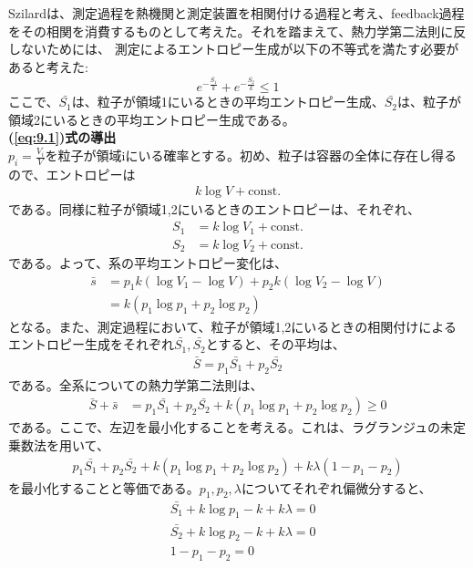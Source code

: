\documentclass[a4paper,11pt]{jsarticle}
\numberwithin{equation}{section}
\begin{document}
Szilardは、測定過程を熱機関と測定装置を相関付ける過程と考え、feedback過程をその相関を消費するものとして考えた。それを踏まえて、熱力学第二法則に反しないためには、
測定によるエントロピー生成が以下の不等式を満たす必要があると考えた:
\begin{equation}
    e^{-\frac{\bar{S_1}}{k}} + e^{-\frac{\bar{S_2}}{k}} \leq 1 \label{eq:9.1}
\end{equation}
ここで、$\bar{S_1}$は、粒子が領域1にいるときの平均エントロピー生成、$\bar{S_2}$は、粒子が領域2にいるときの平均エントロピー生成である。\\
\textbf{(\ref{eq:9.1})式の導出}\\
$p_i = \frac{V_i}{V}$を粒子が領域iにいる確率とする。初め、粒子は容器の全体に存在し得るので、エントロピーは
\begin{align}
k\log V + \text{const.}
\end{align}
である。同様に粒子が領域1,2にいるときのエントロピーは、それぞれ、
\begin{align}
    S_1 &= k\log V_1 + \text{const.} \\
    S_2 &= k\log V_2 + \text{const.}
\end{align}
である。よって、系の平均エントロピー変化は、
\begin{align}
    \bar{s} &=p_1k(\log V_1 - \log V) + p_2k(\log V_2 - \log V) \\
    &= k(p_1\log p_1 + p_2\log p_2)
\end{align}
となる。また、測定過程において、粒子が領域1,2にいるときの相関付けによるエントロピー生成をそれぞれ$\bar{S_1},\bar{S_2}$とすると、その平均は、
\begin{align}
    \bar{S} = p_1\bar{S_1} + p_2\bar{S_2}
\end{align}
である。全系についての熱力学第二法則は、
\begin{align}
    \bar{S} + \bar{s} &= p_1\bar{S_1} + p_2\bar{S_2} + k(p_1\log p_1 + p_2\log p_2) \geq 0
\end{align}
である。ここで、左辺を最小化することを考える。これは、ラグランジュの未定乗数法を用いて、
\begin{align}
    p_1\bar{S_1} + p_2\bar{S_2} + k(p_1\log p_1 + p_2\log p_2) + k\lambda(1-p_1-p_2)
\end{align}
を最小化することと等価である。$p_1,p_2,\lambda$についてそれぞれ偏微分すると、
\begin{align}
    &\bar{S_1} +k\log p_1 - k + k\lambda = 0 \\
    &\bar{S_2} +k\log p_2 - k + k\lambda = 0 \\
    &1-p_1-p_2 = 0
\end{align}
\end{document}
